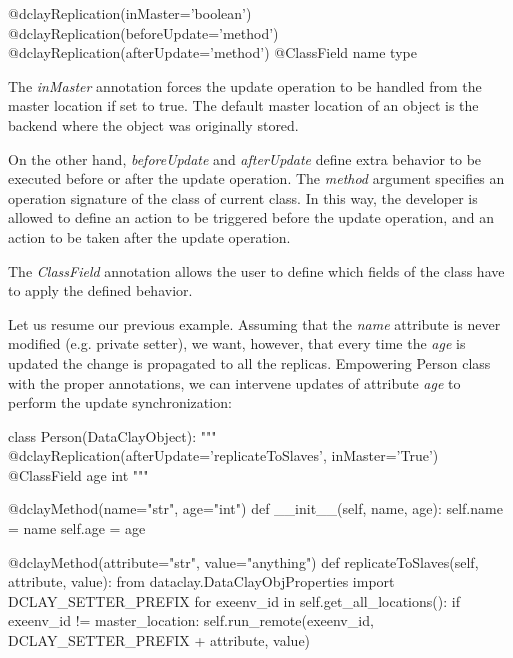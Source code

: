 \begin{tBox}
\begin{python}
@dclayReplication(inMaster='boolean')
@dclayReplication(beforeUpdate='method')
@dclayReplication(afterUpdate='method')
@ClassField name type
\end{python}
\end{tBox}

The \textit{inMaster} annotation forces the update operation to be handled from the master location if set to true. The default master location of an object is the backend where the object was originally stored.

On the other hand, \textit{beforeUpdate} and \textit{afterUpdate} define extra behavior to be executed before or after the update operation. The \textit{method} argument specifies an operation signature of the class of current class. In this way, the developer is allowed to define an action to be triggered before the update operation, and an action to be taken after the update operation.

The \textit{ClassField} annotation allows the user to define which fields of the class have to apply the defined behavior.

Let us resume our previous example. Assuming that the \textit{name} attribute is never modified (e.g. private setter), we want, however, that every time the \textit{age} is updated the change is propagated to all the replicas. Empowering Person class with the proper annotations, we can intervene updates of attribute \textit{age} to perform the update synchronization:

\begin{tBox}
\begin{python}
class Person(DataClayObject):
    """ 
    @dclayReplication(afterUpdate='replicateToSlaves', inMaster='True')
    @ClassField age int
    """

    @dclayMethod(name="str", age="int")
    def __init__(self, name, age):
        self.name = name
        self.age = age

    @dclayMethod(attribute="str", value="anything")
    def replicateToSlaves(self, attribute, value):
        from dataclay.DataClayObjProperties import DCLAY_SETTER_PREFIX
        for exeenv_id in self.get_all_locations():
            if exeenv_id != master_location:
                self.run_remote(exeenv_id, DCLAY_SETTER_PREFIX + attribute, value)
\end{python}
\end{tBox}

